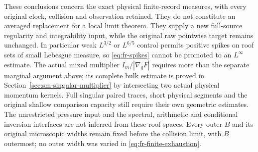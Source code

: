 These conclusions concern the exact physical finite-record measures,
with every original clock, collision and observation retained.
They do not constitute an averaged replacement for a local limit
theorem.  They supply a new full-source regularity and integrability
input, while the original raw pointwise target remains unchanged.
In particular weak $L^{3/2}$ or $L^{6/5}$ control permits positive
spikes on roof sets of small Lebesgue measure, so
\eqref{eq:fr-spikes} cannot be promoted to an $L^\infty$ estimate.
The actual mixed multiplier $I_m/|\nabla_qF|$ requires more than
the separate marginal argument above; its complete bulk estimate
is proved in Section~\ref{sec:sm-singular-multiplier} by intersecting
two actual physical momentum kernels.  Full singular paired traces,
short physical segments and the original shallow comparison capacity
still require their own geometric estimates.  The unrestricted
pressure input and the spectral, arithmetic and conditional inversion
interfaces are not inferred from these roof spaces.  Every outer
$B$ and its original microscopic widths remain fixed before the
collision limit, with $B$ outermost; no outer width was varied in
\eqref{eq:fr-finite-exhaustion}.
